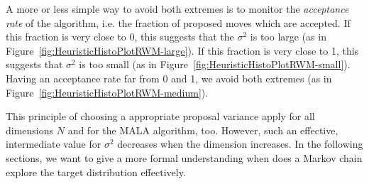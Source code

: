 A more or less simple way to avoid both extremes is to monitor the \textit{acceptance rate} of the algorithm, i.e. the fraction of proposed moves which are accepted. If this fraction is very close to 0, this suggests that the $ \sigma^2 $ is too large (as in Figure~\ref{fig:HeuristicHistoPlotRWM-large}). If this fraction is very close to 1, this suggests that $ \sigma^2 $ is too small (as in Figure~\ref{fig:HeuristicHistoPlotRWM-small}). Having an acceptance rate far from 0 and 1, we avoid both extremes (as in Figure~\ref{fig:HeuristicHistoPlotRWM-medium}).

This principle of choosing a appropriate proposal variance apply for all dimensions $N$ and for the MALA algorithm, too. However, such an effective, intermediate value for $\sigma^2$ decreases when the dimension increases. In the following sections, we want to give a more formal understanding when does a Markov chain explore the target distribution effectively.



